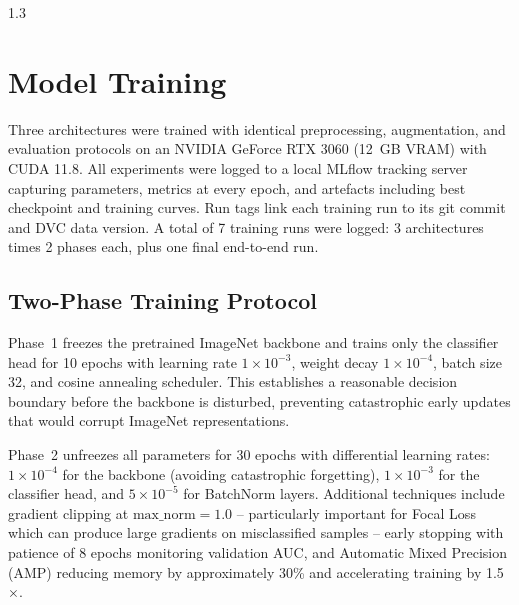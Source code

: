 \begin{spacing}{1.3}
\section{Model Training}

Three architectures were trained with identical preprocessing, augmentation, and evaluation protocols on an NVIDIA GeForce RTX 3060 (12~GB VRAM) with CUDA 11.8. All experiments were logged to a local MLflow tracking server capturing parameters, metrics at every epoch, and artefacts including best checkpoint and training curves. Run tags link each training run to its git commit and DVC data version. A total of 7 training runs were logged: 3 architectures times 2 phases each, plus one final end-to-end run.

\subsection{Two-Phase Training Protocol}

Phase~1 freezes the pretrained ImageNet backbone and trains only the classifier head for 10 epochs with learning rate \(1 \times 10^{-3}\), weight decay \(1 \times 10^{-4}\), batch size 32, and cosine annealing scheduler. This establishes a reasonable decision boundary before the backbone is disturbed, preventing catastrophic early updates that would corrupt ImageNet representations.

Phase~2 unfreezes all parameters for 30 epochs with differential learning rates: \(1 \times 10^{-4}\) for the backbone (avoiding catastrophic forgetting), \(1 \times 10^{-3}\) for the classifier head, and \(5 \times 10^{-5}\) for BatchNorm layers. Additional techniques include gradient clipping at $\text{max\_norm}=1.0$ -- particularly important for Focal Loss which can produce large gradients on misclassified samples -- early stopping with patience of 8 epochs monitoring validation AUC, and Automatic Mixed Precision (AMP) reducing memory by approximately 30\% and accelerating training by 1.5$\times$.

\begin{figure}[H]
\centering
{}
\end{figure}
\end{spacing}
